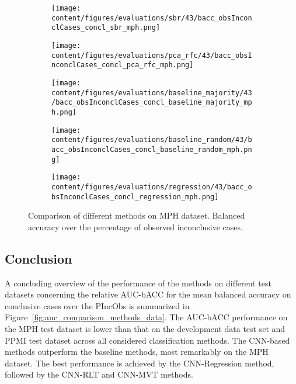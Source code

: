 \begin{figure}[ht]
  \begin{subfigure}{0.5\textwidth}
    \centering
    \texttt{[image: content/figures/evaluations/sbr/43/bacc\_obsInconclCases\_concl\_sbr\_mph.png]}
  \end{subfigure}
  \hfill
  \begin{subfigure}{0.5\textwidth}
    \centering
    \texttt{[image: content/figures/evaluations/pca\_rfc/43/bacc\_obsInconclCases\_concl\_pca\_rfc\_mph.png]}
  \end{subfigure}
  \hfill
  \begin{subfigure}{0.5\textwidth}
    \centering
    \texttt{[image: content/figures/evaluations/baseline\_majority/43/bacc\_obsInconclCases\_concl\_baseline\_majority\_mph.png]}
  \end{subfigure}
  \hfill
  \begin{subfigure}{0.5\textwidth}
    \centering
    \texttt{[image: content/figures/evaluations/baseline\_random/43/bacc\_obsInconclCases\_concl\_baseline\_random\_mph.png]}
  \end{subfigure}
  \hfill
  \begin{subfigure}{0.5\textwidth}
    \centering
    \texttt{[image: content/figures/evaluations/regression/43/bacc\_obsInconclCases\_concl\_regression\_mph.png]}
  \end{subfigure}

  \caption{Comparison of different methods on MPH dataset.
  Balanced accuracy over the percentage of observed inconclusive cases.}
  \label{fig:test_mph}
\end{figure}


\subsection{Conclusion}

A concluding overview of the performance of the methods on different test datasets 
concerning the relative AUC-bACC for the mean balanced accuracy on conclusive cases over the PIncObs 
is summarized in Figure~\ref{fig:auc_comparison_methods_data}.
The AUC-bACC performance on the MPH test dataset is lower than that on the development data test set and PPMI test dataset 
across all considered classification methods.
The CNN-based methods outperform the baseline methods, most remarkably on the MPH dataset.
The best performance is achieved by the CNN-Regression method, followed by the CNN-RLT and CNN-MVT methods.



